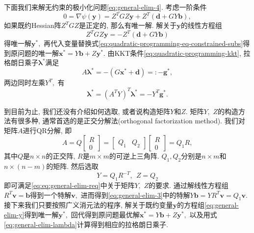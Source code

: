 \documentclass{SBCbookchapter}
\newcommand{\V}[1]{{\bm{#1}}}
\numberwithin{equation}{section}
\begin{document}
下面我们来解无约束的极小化问题\eqref{eq:general-elim-4}. 考虑一阶条件
\begin{equation}
\label{eq:general-elim-5}
0 = \nabla \psi (\V{y}) = Z^T G Z \V{y} + Z^T \left( \V{d} + G Y \V{b} \right),
\end{equation}
如果既约Hessian阵$Z^T G Z$是正定的, 那么有唯一解. 解关于$\V{y}$的线性方程组
\begin{equation}
\label{eq:general-elim-y}
Z^T G Z \V{y} = - Z^T \left( \V{d} + G Y \V{b} \right)
\end{equation}
得唯一解$\V{y}^*,$ 再代入变量替换式\eqref{eq:quadratic-programming-eq-constrained-subs}得到原问题的唯一解$\V{x}^* = Y \V{b} + Z \V{y}^*.$ 由KKT条件\eqref{eq:quadratic-programming-kkt}, 拉格朗日乘子$\V{\lambda}^*$满足
\begin{equation}
\label{eq:general-elim-lagrange}
A \V{\lambda}^* = -\left( G \V{x}^* + \V{d} \right) =: - \V{g}^*,
\end{equation}
两边同时左乘$Y^T,$ 有
\begin{equation}
\label{eq:general-elim-lambda}
\V{\lambda}^* = \left( A^T Y \right)^T \V{\lambda}^* = -Y^T \V{g}^*.
\end{equation}

到目前为止, 我们还没有介绍如何选取, 或者说构造矩阵$Y$和$Z.$ 矩阵$Y,$ $Z$的构造方法有很多种, 通常首选的是正交分解法(orthogonal factorization method). 我们对矩阵$A$进行QR分解, 即
\begin{equation}
\label{eq:quadratic-programming-qr-decomp-1}
A = Q \begin{bmatrix} R \\ 0 \end{bmatrix} = \begin{bmatrix} Q_1 & Q_2 \end{bmatrix} \begin{bmatrix} R \\ 0 \end{bmatrix} = Q_1 R,
\end{equation}
其中$Q$是$n \times n$的正交阵, $R$是$m \times m$的可逆上三角阵. $Q_1, Q_2$分别是$n \times m$和$n \times (n - m)$的矩阵. 然后选取
\begin{equation}
\label{eq:quadratic-programming-qr-decomp-2}
Y = Q_1 R^{-T}, ~~ Z = Q_2
\end{equation}
即可满足\eqref{eq:eq:general-elim-req}中关于矩阵$Y,$ $Z$的要求. 通过解线性方程组$R^T \V{v} = \V{b}$得到一个特解$\V{v},$ 进而得到\eqref{eq:general-elim-3}中的特解$Y \V{b} = Y R^T \V{v} = Q_1 \V{v}.$ 接下来我们只要按照广义消元法的程序, 解关于既约变量$\V{y}$的方程组\eqref{eq:general-elim-y}得到唯一解$\V{y}^*,$ 回代得到原问题最优解$\V{x}^* = Y \V{b} + Z \V{y}^*,$ 以及用式\eqref{eq:general-elim-lambda}计算得到相应的拉格朗日乘子.
\end{document}
